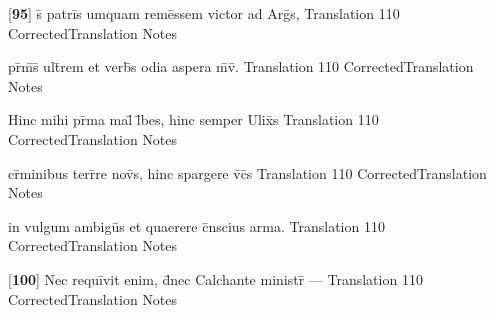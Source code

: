 \latline
  {[\textbf{95}] s\={\macron {\i}} patri\={}s umquam reme\={}ssem victor ad Arg\={}s,}
  { Translation }
  {110}
  { CorrectedTranslation }
  { Notes }


\latline
  {pr\={}m\={\macron {\i}}s\={\macron {\i}} ult\={}rem et verb\={\macron {\i}}s odia aspera m\={}v\={\macron {\i}}.}
  { Translation }
  {110}
  { CorrectedTranslation }
  { Notes }


\latline
  {Hinc mihi pr\={\macron {\i}}ma mal\={\macron {\i}} l\={}bes, hinc semper Ulix\={}s}
  { Translation }
  {110}
  { CorrectedTranslation }
  { Notes }


\latline
  {cr\={\macron {\i}}minibus terr\={}re nov\={\macron {\i}}s, hinc spargere v\={}c\={}s}
  { Translation }
  {110}
  { CorrectedTranslation }
  { Notes }


\latline
  {in vulgum ambigu\={}s et quaerere c\={}nscius arma.}
  { Translation }
  {110}
  { CorrectedTranslation }
  { Notes }


\latline
  {[\textbf{100}] Nec requi\={}vit enim, d\={}nec Calchante ministr\={} ---}
  { Translation }
  {110}
  { CorrectedTranslation }
  { Notes }


